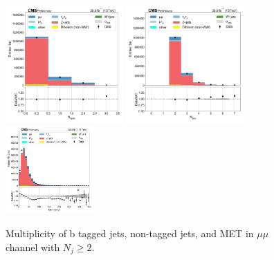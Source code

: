 \begin{figure}[htb!]
    \centering
    \includegraphics[width=0.4\textwidth]{chapters/Analysis/sectionPlots/figures/data_mc_overlays/mumu_2016_inclusive_linear_jet_n_bjets}
    \includegraphics[width=0.4\textwidth]{chapters/Analysis/sectionPlots/figures/data_mc_overlays/mumu_2016_inclusive_linear_jet_n_jets}
    \includegraphics[width=0.3\textwidth]{chapters/Analysis/sectionPlots/figures/data_mc_overlays/mumu_2016_inclusive_linear_misc_met_mag}
    \caption{Multiplicity of b tagged jets, non-tagged jets, and MET in
    $\mu\mu$ channel with $N_{j} \geq 2$.}
    \label{fig:analysis:plots:ee_jetmet}
\end{figure}

